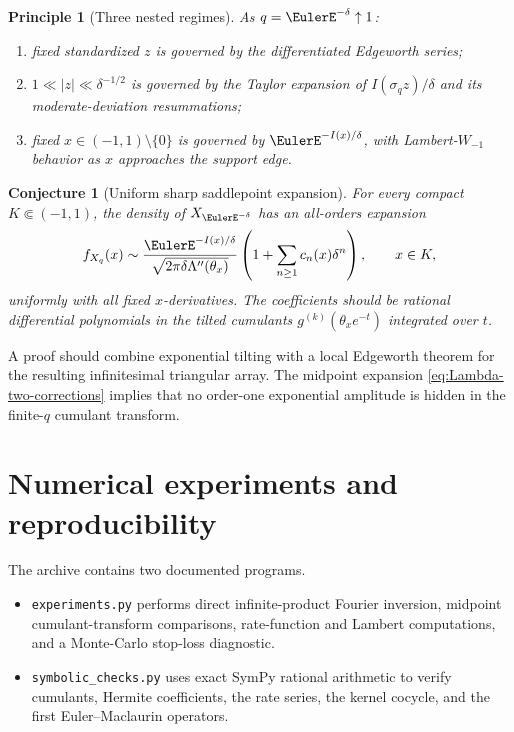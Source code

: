 \documentclass[11pt,a4paper]{article}
\newtheorem{conjecture}[theorem]{Conjecture}
\newtheorem{principle}[theorem]{Principle}
\theoremstyle{definition}
\begin{document}
\begin{principle}[Three nested regimes]
\label{prin:three-regimes}
As $q=\EulerE^{-\delta}\uparrow1$:
\begin{enumerate}[label=(\roman*)]
\item fixed standardized $z$ is governed by the differentiated Edgeworth
series;
\item $1\ll |z|\ll\delta^{-1/2}$ is governed by the Taylor expansion of
$I(\sigma_qz)/\delta$ and its moderate-deviation resummations;
\item fixed $x\in(-1,1)\setminus\{0\}$ is governed by
$\EulerE^{-I(x)/\delta}$, with Lambert-$W_{-1}$ behavior as $x$ approaches the
support edge.
\end{enumerate}
\end{principle}

\begin{conjecture}[Uniform sharp saddlepoint expansion]
\label{conj:saddlepoint}
For every compact $K\Subset(-1,1)$, the density of $X_{\EulerE^{-\delta}}$ has an
all-orders expansion
\begin{equation}
 f_{X_q}(x)\sim
 \frac{\EulerE^{-I(x)/\delta}}
      {\sqrt{2\pi\delta\Lambda''(\theta_x)}}
 \left(1+\sum_{n\ge1}c_n(x)\delta^n\right),
 \qquad x\in K,
 \label{eq:saddlepoint-conjecture}
\end{equation}
uniformly with all fixed $x$-derivatives.  The coefficients should be
rational differential polynomials in the tilted cumulants
$g^{(k)}(\theta_xe^{-t})$ integrated over $t$.
\end{conjecture}

A proof should combine exponential tilting with a local Edgeworth theorem for
the resulting infinitesimal triangular array.  The midpoint expansion
\eqref{eq:Lambda-two-corrections} implies that no order-one exponential
amplitude is hidden in the finite-$q$ cumulant transform.

\section{Numerical experiments and reproducibility}
\label{sec:numerics}

The archive contains two documented programs.

\begin{itemize}
\item \texttt{experiments.py} performs direct infinite-product Fourier
inversion, midpoint cumulant-transform comparisons, rate-function and
Lambert computations, and a Monte-Carlo stop-loss diagnostic.
\item \texttt{symbolic\_checks.py} uses exact SymPy rational arithmetic to
verify cumulants, Hermite coefficients, the rate series, the kernel cocycle,
and the first Euler--Maclaurin operators.
\end{itemize}
\end{document}
